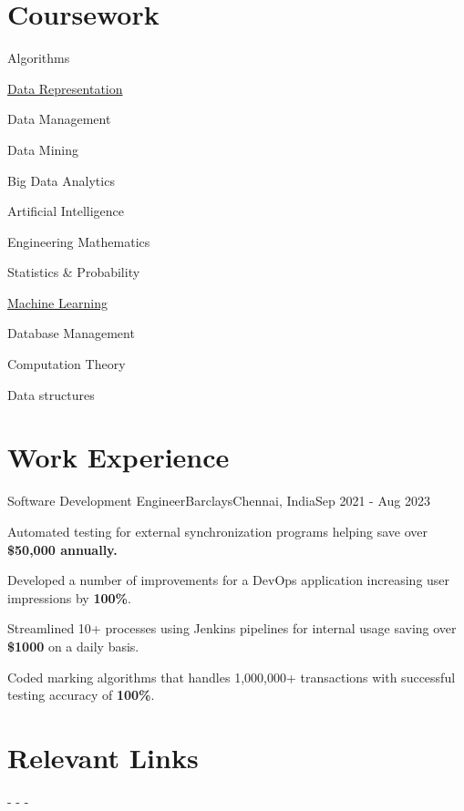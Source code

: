 \documentclass[letterpaper]{resume_config}
\begin{document}
\section{Coursework}
\begin{SkillsList}{
    \item{Algorithms}
    \item{\href{https://coursera.org/share/60e08a9390dc0ed469da34213f7a9d9c}{Data Representation}}
    \item{Data Management}
    \item{Data Mining}
    \item{Big Data Analytics}
    \item{Artificial Intelligence}
    \item{Engineering Mathematics}
    \item{Statistics \& Probability}
    \item{\href{https://coursera.org/share/b76edb1c16934e4a06f3553c2c4e67b8}{Machine Learning}}
    \item{Database Management}
    \item{Computation Theory}
    \item{Data structures}
}
\end{SkillsList}



\section{Work Experience}

\WorkExperience
    {Software Development Engineer}{Barclays}{}{Chennai, India}{Sep 2021 - Aug 2023}
    {
        \item {Automated testing for external synchronization programs helping save over \textbf{\$50,000 annually.}}
        \item {Developed a number of improvements for a DevOps application increasing user impressions by \textbf{100\%}.} 
        \item {Streamlined 10+ processes using Jenkins pipelines for internal usage saving over \textbf{\$1000} on a daily basis.}
        \item {Coded marking algorithms that handles 1,000,000+ transactions with successful testing accuracy of \textbf{100\%}.}
    }

\section{Relevant Links}
-  
-  
- 
\end{document}
